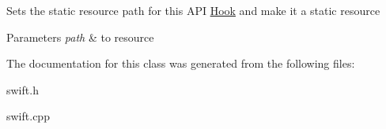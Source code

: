 Sets the static resource path for this A\-P\-I \hyperlink{classswift_1_1_hook}{Hook} and make it a static resource 
\begin{DoxyParams}{Parameters}
{\em path} & to resource \\
\hline
\end{DoxyParams}


The documentation for this class was generated from the following files\-:\begin{DoxyCompactItemize}
\item 
swift.\-h\item 
swift.\-cpp\end{DoxyCompactItemize}
